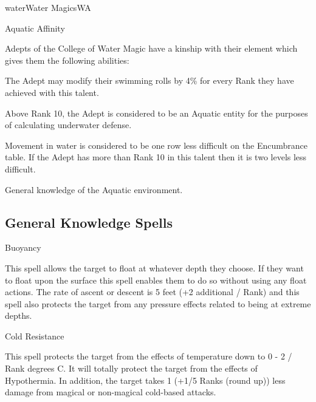 \begin{college}[1.3]{water}{Water Magics}{WA}
\begin{talent}[T-3]{Aquatic Affinity}
\begin{effects}
Adepts of the College of Water Magic have a kinship with their element
which gives them the following abilities:
\begin{Enumerate}
\item The Adept may modify their swimming rolls by 4\% for every Rank they   
have achieved with this talent.
\item Above Rank 10, the Adept is considered to be an Aquatic entity for the   
purposes of calculating underwater defense.
\item Movement in water is considered to be one row less difficult on the   
Encumbrance table. If the Adept has more than Rank 10 in this talent then   
it is two levels less difficult.
\item General knowledge of the Aquatic environment.
\end{Enumerate}
\end{effects}
\end{talent}

\subsection{General Knowledge Spells}

\begin{spell}[G-1]{Buoyancy}

\begin{effects}
This spell allows the target to float at whatever depth they
choose. If they want to float upon the surface this spell enables them
to do so without using any float actions. The rate of ascent or descent
is 5 feet (+2 additional / Rank) and this spell also protects the target
from any pressure effects related to being at extreme depths.
\end{effects}
\end{spell}

\begin{spell}[G-2]{Cold Resistance}

\begin{effects}
This spell protects the target from the effects of temperature down to
0 - 2 / Rank degrees C. It will totally protect the target from the
effects of Hypothermia. In addition, the target takes 1 (+1/5 Ranks
(round up)) less damage from magical or non-magical cold-based
attacks.
\end{effects}
\end{spell}



\end{college}
